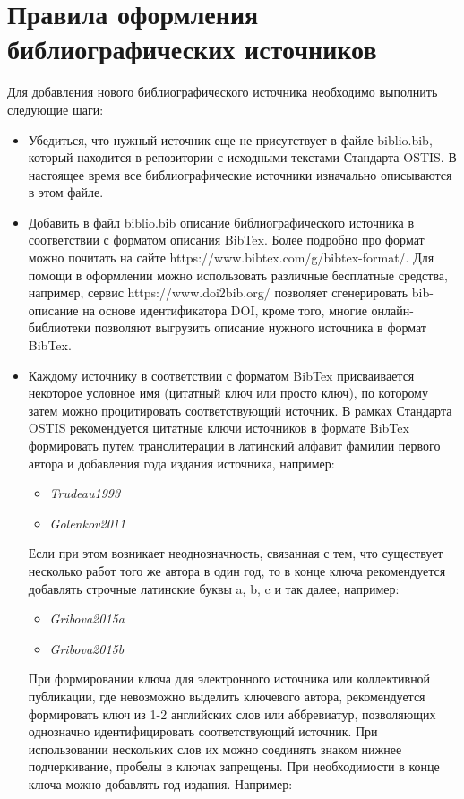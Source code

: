 \section*{Правила оформления библиографических источников}

Для добавления нового библиографического источника необходимо выполнить следующие шаги:
\begin{itemize}
	\item Убедиться, что нужный источник еще не присутствует в файле biblio.bib, который находится в репозитории с исходными текстами Стандарта OSTIS. В настоящее время все библиографические источники изначально описываются в этом файле.
	\item Добавить в файл biblio.bib описание библиографического источника в соответствии с форматом описания BibTex. Более подробно про формат можно почитать на сайте https://www.bibtex.com/g/bibtex-format/. Для помощи в оформлении можно использовать различные бесплатные средства, например, сервис https://www.doi2bib.org/ позволяет сгенерировать bib-описание на основе идентификатора DOI, кроме того, многие онлайн-библиотеки позволяют выгрузить описание нужного источника в формат BibTex.
	\item Каждому источнику в соответствии с форматом BibTex присваивается некоторое условное имя (цитатный ключ или просто ключ), по которому затем можно процитировать соответствующий источник. В рамках Стандарта OSTIS рекомендуется цитатные ключи источников в формате BibTex формировать путем транслитерации в латинский алфавит фамилии первого автора и добавления года издания источника, например:
	
	\begin{itemize}
		\item \textit{Trudeau1993}
		\item \textit{Golenkov2011}
	\end{itemize}
	
	Если при этом возникает неоднозначность, связанная с тем, что существует несколько работ того же автора в один год, то в конце ключа рекомендуется добавлять строчные латинские буквы a, b, c и так далее, например:
	
	\begin{itemize}
		\item \textit{Gribova2015a}
		\item \textit{Gribova2015b}
	\end{itemize}
	
	При формировании ключа для электронного источника или коллективной публикации, где невозможно выделить ключевого автора, рекомендуется формировать ключ из 1-2 английских слов или аббревиатур, позволяющих однозначно идентифицировать соответствующий источник. При использовании нескольких слов их можно соединять знаком нижнее подчеркивание, пробелы в ключах запрещены. При необходимости в конце ключа можно добавлять год издания. Например:
	

\end{itemize}
